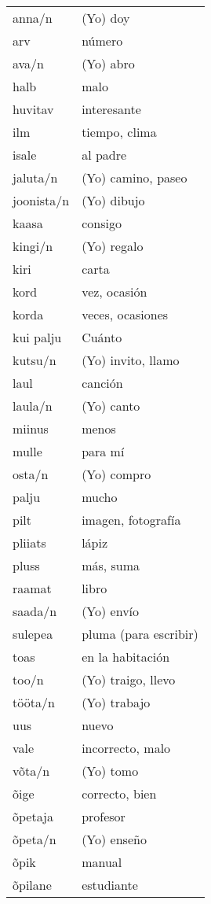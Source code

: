 \begin{tabular}{ l l }
anna/n		&	(Yo) doy \\
arv			&	número \\
ava/n		&	(Yo) abro \\
halb		&	malo \\
huvitav		&	interesante \\
ilm			&	tiempo, clima \\
isale		&	al padre \\
jaluta/n	&	(Yo) camino, paseo \\
joonista/n	&	(Yo) dibujo \\
kaasa		&	consigo \\
kingi/n		&	(Yo) regalo \\
kiri		&	carta \\
kord		&	vez, ocasión \\
korda		&	veces, ocasiones \\
kui palju	&	Cuánto \\
kutsu/n		&	(Yo) invito, llamo \\
laul		&	canción \\
laula/n		&	(Yo) canto \\
miinus		&	menos \\
mulle		&	para mí \\
osta/n		&	(Yo) compro \\
palju		&	mucho \\
pilt		&	imagen, fotografía \\
pliiats		&	lápiz \\
pluss		&	más, suma \\
raamat		&	libro \\
saada/n		&	(Yo) envío \\
sulepea		&	pluma (para escribir) \\
toas		&	en la habitación \\
too/n		&	(Yo) traigo, llevo \\
tööta/n		&	(Yo) trabajo \\
uus			& 	nuevo \\
vale		&	incorrecto, malo \\
võta/n		&	(Yo) tomo \\
õige		&	correcto, bien \\
õpetaja		&	profesor \\
õpeta/n		&	(Yo) enseño \\
õpik		&	manual \\
õpilane		&	estudiante
\end{tabular}
\bigskip

